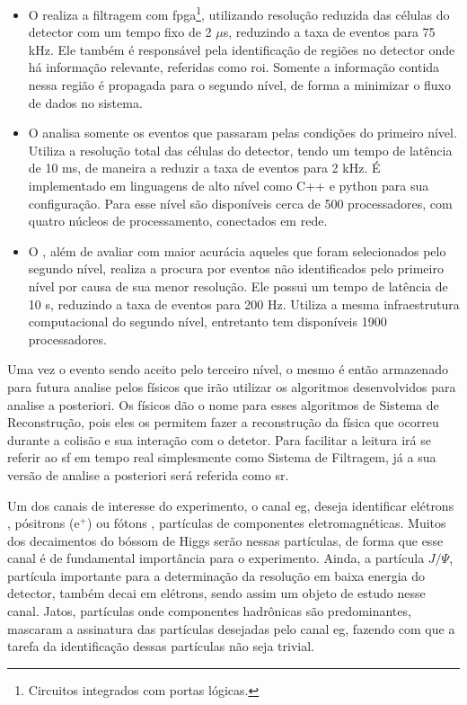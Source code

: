 \begin{itemize}
\item O  realiza a filtragem com
\gls{fpga}\footnote{Circuitos integrados com portas lógicas.}, 
utilizando resolução reduzida das células do detector
com um tempo fixo de 2 $\mu$s, reduzindo a taxa de eventos para
75 kHz. Ele também é responsável pela identificação de regiões no detector onde
há informação relevante, referidas como \gls{roi}. Somente a
informação contida nessa região é propagada para o segundo nível, de forma a
minimizar o fluxo de dados no sistema.
\item O  analisa somente os eventos que passaram pelas condições do
primeiro nível. Utiliza a resolução total das células do detector, 
tendo um tempo de latência de 10 ms, de maneira a reduzir a taxa de eventos para
2 kHz. É implementado em linguagens de alto nível como C++ e python para sua configuração. 
Para esse nível são disponíveis cerca de 500 processadores, com quatro
núcleos de processamento, conectados em rede.
\item O , além de avaliar com maior acurácia aqueles que foram
selecionados pelo segundo nível, realiza a procura por eventos não identificados pelo
primeiro nível por causa de sua menor resolução. Ele possui um tempo de 
latência de 10 s, reduzindo a taxa de eventos para 200 Hz. Utiliza a mesma
infraestrutura computacional do segundo nível, entretanto tem disponíveis 1900
processadores.
\end{itemize}

Uma vez o evento sendo aceito pelo terceiro nível, o mesmo é então armazenado
para futura analise pelos físicos que irão utilizar os algoritmos desenvolvidos 
para analise a posteriori. Os físicos dão o nome para esses algoritmos de Sistema de
Reconstrução, pois eles os permitem fazer a reconstrução da física que ocorreu
durante a colisão e sua interação com o detetor. Para facilitar a leitura irá se 
referir ao \glsdesc{sf} em tempo real simplesmente como Sistema de 
Filtragem, já a sua versão de analise a posteriori será referida como \glsdesc{sr}.

Um dos canais de interesse do experimento, o canal \acrshort{eg},
deseja identificar elétrons , pósitrons (e$^+$)
ou fótons , 
partículas de componentes eletromagnéticas. Muitos dos decaimentos do bóssom de
Higgs serão nessas partículas, de forma que esse canal é de fundamental
importância para o experimento. Ainda, a partícula $J/\Psi$, partícula importante
para a determinação da resolução em baixa energia do detector, 
também decai em elétrons, sendo assim um objeto de estudo nesse canal.
Jatos, partículas onde componentes hadrônicas são predominantes, 
mascaram a assinatura das partículas desejadas pelo canal \acrshort{eg}, fazendo 
com que a tarefa da identificação dessas partículas não seja trivial.

